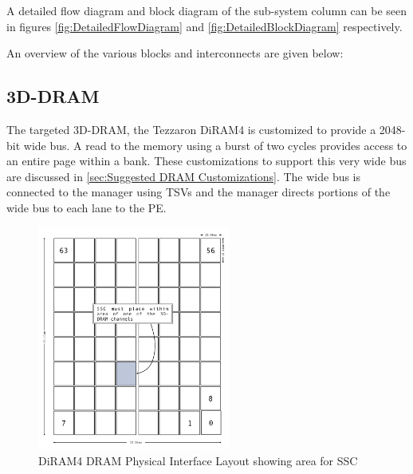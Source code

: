 \documentclass[journal]{IEEEtran}
\begin{document}
A detailed flow diagram and block diagram of the sub-system column can be seen in figures \ref{fig:DetailedFlowDiagram} and \ref{fig:DetailedBlockDiagram} respectively.

An overview of the various blocks and interconnects are given below:

\subsection{3D-DRAM}
The targeted 3D-DRAM, the Tezzaron DiRAM4 is customized to provide a 2048-bit wide bus. A read to the memory using a burst of two cycles provides access to an entire page within a bank.
These customizations to support this very wide bus are discussed in \ref{sec:Suggested DRAM Customizations}.
The wide bus is connected to the manager using TSVs and the manager directs portions of the wide bus to each lane to the PE.
\begin{figure}[!t]
\captionsetup{width=.9\linewidth}
\centerline{
\mbox{\includegraphics[width=2.5in]{DiRAM4Layout.jpg}}
}
\caption{DiRAM4 DRAM Physical Interface Layout\cite{tezzaron:diram4}\cite{patti2014} showing area for SSC }
\label{fig:diram4Layout}
\end{figure}


\end{document}
